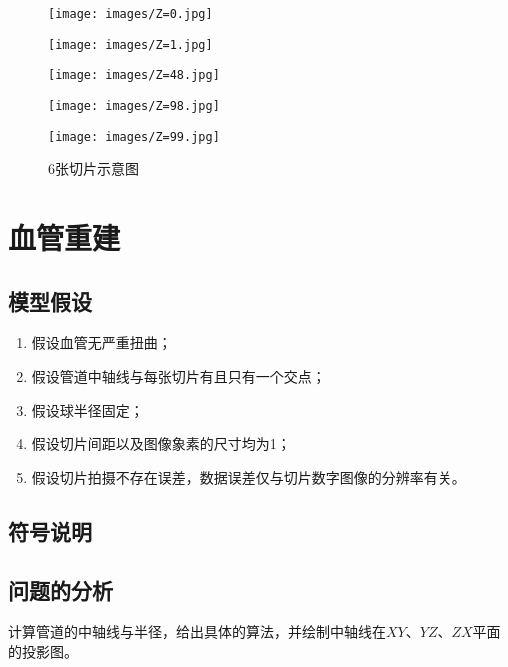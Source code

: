 \begin{figure}[H]
  \centering
  \begin{varwidth}[t]{\textwidth}
    \vspace{0pt}
    \texttt{[image: images/Z=0.jpg]}
  \end{varwidth}
  \quad
  \begin{varwidth}[t]{\textwidth}
    \vspace{0pt}
    \texttt{[image: images/Z=1.jpg]}
  \end{varwidth}
    \quad
  \begin{varwidth}[t]{\textwidth}
    \vspace{0pt}
    \texttt{[image: images/Z=48.jpg]}
  \end{varwidth}
    \quad
  \begin{varwidth}[t]{\textwidth}
    \vspace{0pt}
    \texttt{[image: images/Z=98.jpg]}
  \end{varwidth}
    \quad
  \begin{varwidth}[t]{\textwidth}
    \vspace{0pt}
    \texttt{[image: images/Z=99.jpg]}
  \end{varwidth}
  \caption{6张切片示意图}
  \label{6张切片示意图}
\end{figure}

\section{血管重建}
    \subsection{模型假设}
        \begin{enumerate}
        \item 假设血管无严重扭曲；
        \item 假设管道中轴线与每张切片有且只有一个交点；
        \item 假设球半径固定；
        \item 假设切片间距以及图像象素的尺寸均为1；
        \item 假设切片拍摄不存在误差，数据误差仅与切片数字图像的分辨率有关。
        \end{enumerate}
    \subsection{符号说明}
    \subsection{问题的分析}
        \par
        计算管道的中轴线与半径，给出具体的算法，并绘制中轴线在$XY$、$YZ$、$ZX$平面的投影图。
